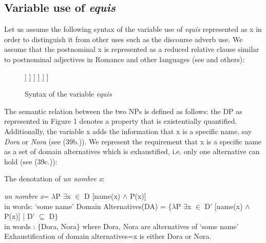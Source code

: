 \documentclass[output=paper
,modfonts
,nonflat]{langsci/langscibook}
\begin{document}
\subsection{Variable use of \textit{equis}}\label{sec:kellert:3.2}
Let us assume the following syntax of the variable use of \textit{equis} represented as x in order to distinguish it from other uses such as the discourse adverb use. We assume that the postnominal x is represented as a reduced relative clause similar to postnominal adjectives in Romance and other languages (see \citealt{Cinque2010} and others):


\begin{figure}
	\begin{forest}
		[DP
			[D\\\textit{un}\\`a'] [NP
				[NP\\\textit{nombre}\\`name'] [CP
					[C\\(\textit{que})\\`that'] [TP
						[T\\(\textit{es})\\`is'] [VP
							[~] [NP [$X$,roof]]
						]
					]
				]
			]
		]
	\end{forest}
	\caption{Syntax of the variable \textit{equis}\label{fig:kellert:tree1n}}

\end{figure}

The semantic relation between the two NPs is defined as follows: the DP as represented in Figure 1 denotes a property that is existentially quantified. Additionally, the variable x adds the information that x is a specific name, say \textit{Dora} or \textit{Nora} (see (39b.)). We represent the requirement that x is a specific name as a set of domain alternatives which is exhaustified, i.e. only one alternative can hold (see (39c.)): 

\ea The denotation of \textit{un nombre x}:
\begin{xlist}
\ex
{\textlbrackdbl \textit{un nombre x}\textrbrackdbl = $\lambda$P $\exists$x $\in$ D [name(x) $\wedge$ P(x)]}\\
in words: ‘some name’
\ex
{Domain Alternatives(DA) = $\lbrace$$\lambda$P $\exists$x $\in$ D’ [name(x) $\wedge$ P(x)] | D’ $\subseteq$ D$\rbrace$}\\
in words : $\lbrace$Dora, Nora$\rbrace$ where Dora, Nora are alternatives of ‘some name’
\ex
Exhaustification of domain alternatives=x is either Dora or Nora.
\end{xlist}
\z
\end{document}

